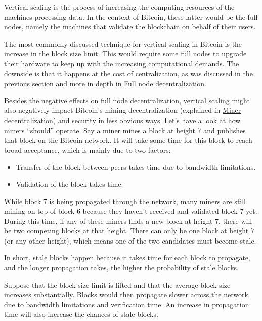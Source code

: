 Vertical scaling is the process of increasing the computing resources of
the machines processing data. In the context of Bitcoin, these latter
would be the full nodes, namely the machines that validate the
blockchain on behalf of their users.

The most commonly discussed technique for vertical scaling in Bitcoin is
the increase in the block size limit. This would require some full nodes
to upgrade their hardware to keep up with the increasing computational
demands. The downside is that it happens at the cost of centralization,
as was discussed in the previous section and more in depth in
\protect\hyperlink{fullnodedecentralization}{Full node
decentralization}.

Besides the negative effects on full node decentralization, vertical
scaling might also negatively impact Bitcoin's mining decentralization
(explained in \protect\hyperlink{minerdecentralization}{Miner
decentralization}) and security in less obvious ways. Let's have a look
at how miners ``should'' operate. Say a miner mines a block at height 7
and publishes that block on the Bitcoin network. It will take some time
for this block to reach broad acceptance, which is mainly due to two
factors:

\begin{itemize}
\item
  Transfer of the block between peers takes time due to bandwidth
  limitations.
\item
  Validation of the block takes time.
\end{itemize}

While block 7 is being propagated through the network, many miners are
still mining on top of block 6 because they haven't received and
validated block 7 yet. During this time, if any of these miners finds a
new block at height 7, there will be two competing blocks at that
height. There can only be one block at height 7 (or any other height),
which means one of the two candidates must become stale.

In short, stale blocks happen because it takes time for each block to
propagate, and the longer propagation takes, the higher the probability
of stale blocks.

Suppose that the block size limit is lifted and that the average block
size increases substantially. Blocks would then propagate slower across
the network due to bandwidth limitations and verification time. An
increase in propagation time will also increase the chances of stale
blocks.

